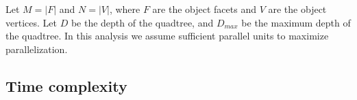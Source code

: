 \documentclass[final,3p,times,twocolumn]{elsarticle}
\begin{document}




%


\appendix


Let $M = |F|$ and $N = |V|$, where $F$ are the object facets and $V$ are the object vertices. Let $D$ be the depth of the quadtree, and $D_{max}$ be the maximum depth of the quadtree. In this analysis we assume sufficient parallel units to maximize parallelization.

\subsection*{Time complexity}
\end{document}
